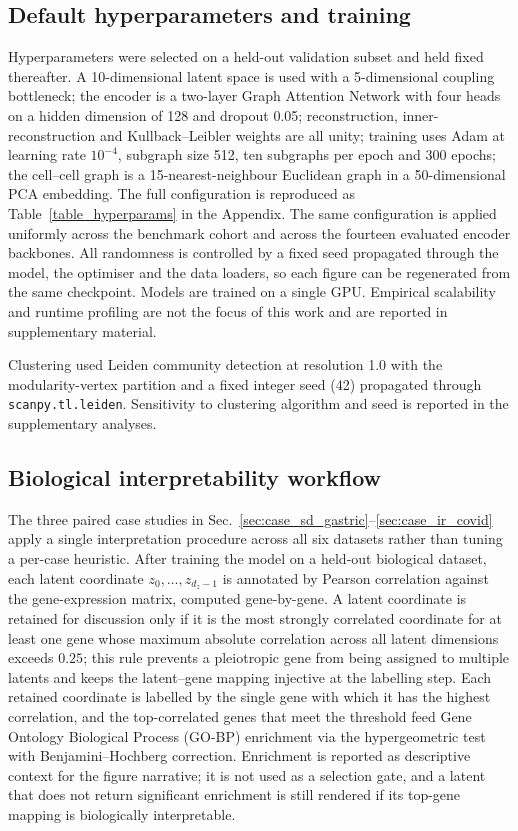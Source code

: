 \documentclass[referee, pdflatex, sn-vancouver-num]{sn-jnl}
\begin{document}
\subsection{Default hyperparameters and training}

Hyperparameters were selected on a held-out validation subset and held fixed thereafter. A 10-dimensional latent space is used with a 5-dimensional coupling bottleneck; the encoder is a two-layer Graph Attention Network with four heads on a hidden dimension of 128 and dropout 0.05; reconstruction, inner-reconstruction and Kullback--Leibler weights are all unity; training uses Adam at learning rate $10^{-4}$, subgraph size 512, ten subgraphs per epoch and 300 epochs; the cell--cell graph is a 15-nearest-neighbour Euclidean graph in a 50-dimensional PCA embedding. The full configuration is reproduced as Table~\ref{table_hyperparams} in the Appendix. The same configuration is applied uniformly across the benchmark cohort and across the fourteen evaluated encoder backbones. All randomness is controlled by a fixed seed propagated through the model, the optimiser and the data loaders, so each figure can be regenerated from the same checkpoint. Models are trained on a single GPU. Empirical scalability and runtime profiling are not the focus of this work and are reported in supplementary material.

Clustering used Leiden community detection at resolution 1.0 with the modularity-vertex partition and a fixed integer seed (42) propagated through \texttt{scanpy.tl.leiden}. Sensitivity to clustering algorithm and seed is reported in the supplementary analyses.

\subsection{Biological interpretability workflow}\label{sec:latent_criteria}

The three paired case studies in Sec.~\ref{sec:case_sd_gastric}--\ref{sec:case_ir_covid} apply a single interpretation procedure across all six datasets rather than tuning a per-case heuristic. After training the model on a held-out biological dataset, each latent coordinate $z_0,\ldots,z_{d_z-1}$ is annotated by Pearson correlation against the gene-expression matrix, computed gene-by-gene. A latent coordinate is retained for discussion only if it is the most strongly correlated coordinate for at least one gene whose maximum absolute correlation across all latent dimensions exceeds $0.25$; this rule prevents a pleiotropic gene from being assigned to multiple latents and keeps the latent--gene mapping injective at the labelling step. Each retained coordinate is labelled by the single gene with which it has the highest correlation, and the top-correlated genes that meet the threshold feed Gene Ontology Biological Process (GO-BP) enrichment via the hypergeometric test with Benjamini--Hochberg correction. Enrichment is reported as descriptive context for the figure narrative; it is not used as a selection gate, and a latent that does not return significant enrichment is still rendered if its top-gene mapping is biologically interpretable.
\end{document}
